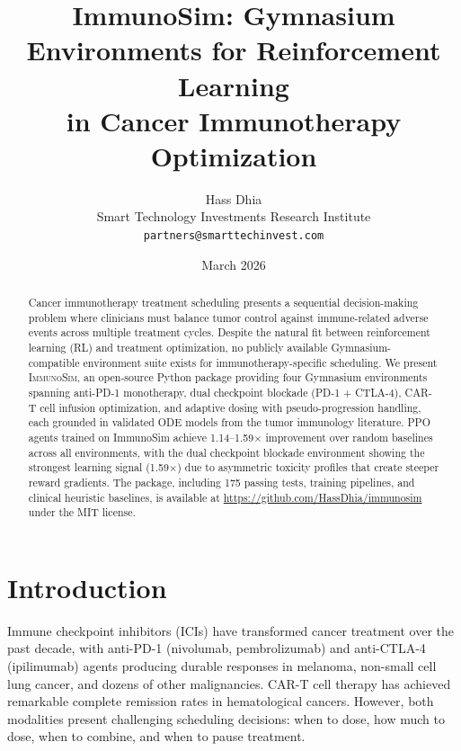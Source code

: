 \documentclass[11pt,a4paper]{article}
\title{ImmunoSim: Gymnasium Environments for Reinforcement Learning\\in Cancer Immunotherapy Optimization}
\author{Hass Dhia\\
Smart Technology Investments Research Institute\\
\texttt{partners@smarttechinvest.com}}
\date{March 2026}
\begin{document}
\maketitle

\begin{abstract}
Cancer immunotherapy treatment scheduling presents a sequential decision-making problem where clinicians must balance tumor control against immune-related adverse events across multiple treatment cycles.
Despite the natural fit between reinforcement learning (RL) and treatment optimization, no publicly available Gymnasium-compatible environment suite exists for immunotherapy-specific scheduling.
We present \textsc{ImmunoSim}, an open-source Python package providing four Gymnasium environments spanning anti-PD-1 monotherapy, dual checkpoint blockade (PD-1 + CTLA-4), CAR-T cell infusion optimization, and adaptive dosing with pseudo-progression handling, each grounded in validated ODE models from the tumor immunology literature.
PPO agents trained on ImmunoSim achieve 1.14--1.59$\times$ improvement over random baselines across all environments, with the dual checkpoint blockade environment showing the strongest learning signal (1.59$\times$) due to asymmetric toxicity profiles that create steeper reward gradients.
The package, including 175 passing tests, training pipelines, and clinical heuristic baselines, is available at \url{https://github.com/HassDhia/immunosim} under the MIT license.
\end{abstract}

\section{Introduction}

Immune checkpoint inhibitors (ICIs) have transformed cancer treatment over the past decade, with anti-PD-1 (nivolumab, pembrolizumab) and anti-CTLA-4 (ipilimumab) agents producing durable responses in melanoma, non-small cell lung cancer, and dozens of other malignancies. CAR-T cell therapy has achieved remarkable complete remission rates in hematological cancers. However, both modalities present challenging scheduling decisions: when to dose, how much to dose, when to combine, and when to pause treatment.
\end{document}
